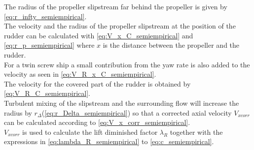 The radius of the propeller slipstream far behind the propeller is given by \autoref{eq:r_infty_semiempirical}.
\begin{equation}
    \label{eq:r_infty_semiempirical}
    
\end{equation}
The velocity and the radius of the propeller slipstream at the position of the rudder can be calculated with \autoref{eq:V_x_C_semiempirical} and \autoref{eq:r_p_semiempirical} where $x$ is the distance between the propeller and the rudder.
\begin{equation}
    \label{eq:V_x_C_semiempirical}
    
\end{equation}
%
\begin{equation}
    \label{eq:r_p_semiempirical}
    
\end{equation}
For a twin screw ship a small contribution from the yaw rate is also added to the velocity as seen in \autoref{eq:V_R_x_C_semiempirical}.
\begin{equation}
    \label{eq:V_R_x_C_semiempirical}
    
\end{equation}
The velocity for the covered part of the rudder is obtained by \autoref{eq:V_R_C_semiempirical}.
\begin{equation}
    \label{eq:V_R_C_semiempirical}
    
\end{equation}
Turbulent mixing of the slipstream and the surrounding flow will increase the radius by $r_\Delta$(\autoref{eq:r_Delta_semiempirical}) so that a corrected axial velocity $V_{xcorr}$ can be calculated according to \autoref{eq:V_x_corr_semiempirical}.
\begin{equation}
    \label{eq:r_Delta_semiempirical}
    
\end{equation}
%
\begin{equation}
    \label{eq:V_x_corr_semiempirical}
    
\end{equation}
$V_{xcorr}$ is used to calculate the lift diminished factor $\lambda_R$ together with the expressions in  \autoref{eq:lambda_R_semiempirical} to \autoref{eq:c_semiempirical}.
\begin{equation}
    \label{eq:lambda_R_semiempirical}
    
\end{equation}
